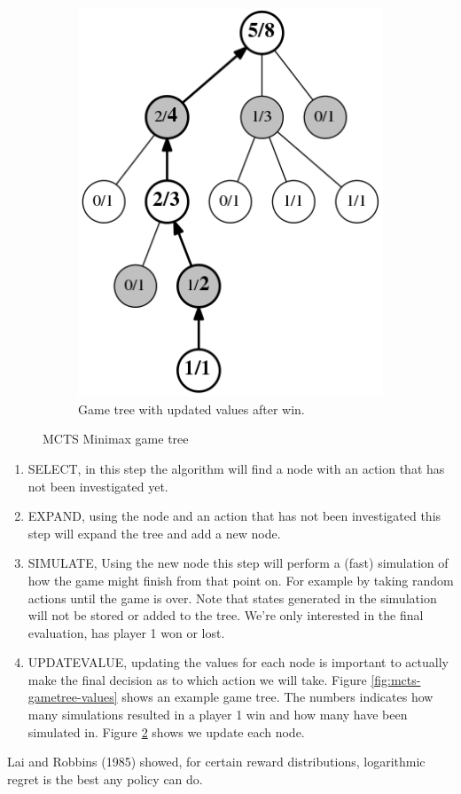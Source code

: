 \documentclass[10pt,letterpaper]{article}
\begin{document}
\begin{figure}
\begin{subfigure}{0.23\textwidth}
    \includegraphics[width=\textwidth]{images/gametree-values-updated}
    \caption{Game tree with  updated values after win.}
    \label{fig:mcts-gametree-values-updated}
    \end{subfigure}
    \caption{MCTS Minimax game tree}
\end{figure}
\begin{enumerate}
    \item SELECT, in this step the algorithm will find a node with an action that has not been investigated yet.
    \item EXPAND, using the node and an action that has not been investigated this step will expand the tree and add a new node.
    \item SIMULATE, Using the new node this step will perform a (fast) simulation of how the game might finish from that point on. For example by taking random actions until the game is over. Note that states generated in the simulation will not be stored or added to the tree. We're only interested in the final evaluation, has player 1 won or lost.
    \item UPDATEVALUE, updating the values for each node is important to actually make the final decision as to which action we will take. Figure \ref{fig:mcts-gametree-values} shows an example game tree. The numbers indicates how many simulations resulted in a player 1 win and how many have been simulated in. Figure \ref{fig:mcts-gametree-values-updated} shows we update each node. 
\end{enumerate}
Lai and Robbins (1985)\cite{Lai+Robbins:1985} showed, for certain reward distributions, logarithmic regret is the best any policy can do.
\end{document}
